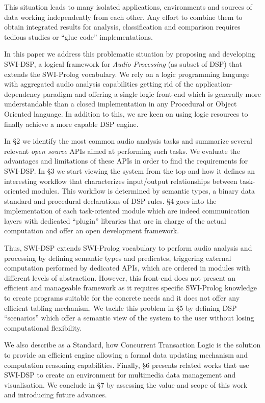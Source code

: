 \documentclass[runningheads]{llncs}
\begin{document}
This situation leads to many isolated applications, environments and sources of data working independently from each other. Any effort to combine them to obtain integrated results for analysis, classification and comparison requires tedious studies or ``glue code'' implementations.

In this paper we address this problematic situation by proposing and developing SWI-DSP, a logical framework for \textit{Audio Processing} (as subset of DSP) that extends the SWI-Prolog vocabulary. We rely on a logic programming language with aggregated audio analysis capabilities getting rid of the application-dependency paradigm and offering a single logic front-end which is generally more understandable than a closed implementation in any Procedural or Object Oriented language. In addition to this, we are keen on using logic resources to finally achieve a more capable DSP engine.

In \S 2 we identify the most common audio analysis tasks and summarize several relevant \textit{open source} APIs aimed at performing such tasks. We evaluate the advantages and limitations of these APIs in order to find the requirements for SWI-DSP. In \S 3 we start viewing the system from the top and how it defines an interesting workflow that characterizes input/output relationships between task-oriented modules. This workflow is determined by semantic types, a binary data standard and procedural declarations of DSP rules. \S 4 goes into the implementation of each task-oriented module which are indeed communication layers with dedicated ``plugin'' libraries that are in charge of the actual computation and offer an open development framework.

Thus, SWI-DSP extends SWI-Prolog vocabulary to perform audio analysis and processing by defining semantic types and predicates, triggering external computation performed by dedicated APIs, which are ordered in modules with different levels of abstraction. However, this front-end does not present an efficient and manageable framework as it requires specific SWI-Prolog knowledge to create programs suitable for the concrete needs and it does not offer any efficient tabling mechanism. We tackle this problem in \S 5 by defining DSP ``scenarios'' which offer a semantic view of the system to the user without losing computational flexibility.

We also describe as a Standard, how Concurrent Transaction Logic is the solution to provide an efficient engine allowing a formal data updating mechanism and computation reasoning capabilities. Finally, \S 6 presents related works that use SWI-DSP to create an environment for multimedia data management and visualisation. We conclude in \S 7 by assessing the value and scope of this work and introducing future advances.
\end{document}
